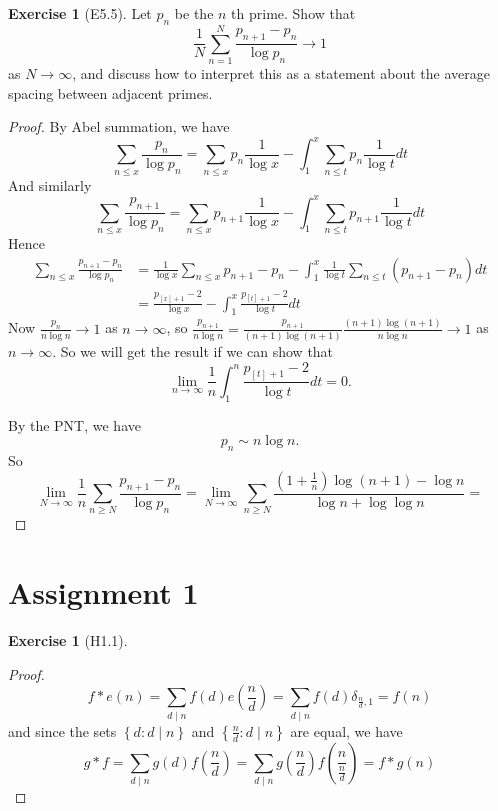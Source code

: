 \documentclass[reqno]{amsart}
\theoremstyle{definition}
\newtheorem{exercise}[theorem]{Exercise}
\theoremstyle{remark}
\begin{document}
\begin{exercise}[E5.5]
    Let $p_n$ be the $n$ th prime. Show that
    \[
    \frac{1}{N} \sum_{n=1}^{N} \frac{p_{n+1}- p_n}{\log p_n}
    \to 1
    \] 
    as $N \to \infty$, and discuss how to interpret
    this as a statement about the average
    spacing between adjacent primes.
\end{exercise}


\begin{proof}
    By Abel summation, we have
    \[
    \sum_{n\le x} \frac{p_n}{\log p_n}
    = \sum_{n\le x} p_n \frac{1}{\log x}
    - \int_{1}^{x} \sum_{n\le t} p_n \frac{1}{\log t}dt 
    \] 
    And similarly
    \[
    \sum_{n\le x} \frac{p_{n+1}}{\log p_n}
    = \sum_{n\le x} p_{n+1} \frac{1}{\log x}
    - \int_{1}^{x} \sum_{n\le t} p_{n+1} \frac{1}{\log t}dt 
    \] 
    Hence
    \begin{align*}
    \sum_{n\le x} \frac{p_{n+1} - p_n}{\log p_n}
    &= \frac{1}{\log x} \sum_{n\le x} p_{n+1} -p_n
    - \int_{1}^{x} \frac{1}{\log t} \sum_{n \le t}(p_{n+1}-p_n) dt\\
    &= \frac{p_{\left[ x \right] +1} - 2}{\log x} 
    - \int_{1}^{x} \frac{p_{\left[ t \right] +1} - 2}{\log t} dt
    \end{align*}
    Now
    $\frac{p_n}{n \log n} \to 1$ as $n \to \infty$, so
    $\frac{p_{n+1}}{n \log n}
    = \frac{p_{n+1}}{(n+1) \log(n+1)} \frac{(n+1) \log(n+1)}{
    n \log n}
    \to 1$ as $n \to \infty$. So we will get
    the result if we can show that
    \[
    \lim_{n \to \infty} \frac{1}{n} 
    \int_{1}^{n} \frac{p_{\left[ t \right] +1}-2}{\log t} dt 
    = 0.
    \] 

    By the PNT, we have
    \[
    p_n \sim n \log n.
    \] 
    So
    \[
    \lim_{N \to \infty} \frac{1}{n} \sum_{n \ge N}
    \frac{p_{n+1}-p_n}{\log p_n}
    = \lim_{N\to \infty}
    \sum_{n\ge N} \frac{(1+\frac{1}{n})\log(n+1) - \log n}{\log n + 
    \log \log n}
    = 
    \] 
\end{proof}


\section{Assignment 1}


    \begin{exercise}[H1.1]
        \begin{proof}
            \[
            f * e (n) = \sum_{d  \mid n} f(d) e (\frac{n}{d})
            = \sum_{d  \mid n} f(d) \delta_{\frac{n}{d},1}
            = f(n)
            \] 
            and since the sets
            $\left\{ d \colon d \mid n \right\} $ and
            $\left\{ \frac{n}{d}  \colon
            d  \mid n\right\} $ are equal, we have
            \[
            g * f = 
            \sum_{d \mid n} g(d) f\left( \frac{n}{d} \right) 
            =
            \sum_{d  \mid n} g\left( \frac{n}{d} \right) 
            f \left( \frac{n}{\frac{n}{d}} \right) 
            = f * g (n)
            \] 
        \end{proof}
    \end{exercise}
\end{document}

